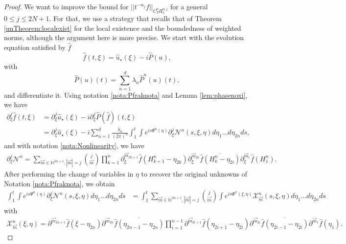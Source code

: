 \documentclass[a4paper, 15pt]{article}
\numberwithin{equation}{section}
\begin{document}
\begin{proof}
We want to improve the bound for $||t^{-\alpha_j}f||_{C^0_T H^{0,j}_x}$ for a general $0\leq j \leq 2N+1$. For that, we use a strategy that recalls that of Theorem \ref{unTheorem:localexist} for the local existence and the boundedness of weighted norms, although the argument here is more precise. We start with the evolution equation satisfied by $\hat{f}$
\begin{equation}
\label{eq:recallNLSduhamfFourier}
    \hat{f}(t,\xi)=\hat{u}_\star(\xi)-i\hat{P}(u),
\end{equation}
with 
\begin{equation}
    \hat{P}(u)(t)=\sum_{n=1}^{d}\lambda_n\hat{P}^n(u)(t),
\end{equation}
and differentiate it. Using notation \ref{nota:Pfraknota} and Lemma \ref{lem:phasenoxi}, we have 
\begin{align*}
\partial^{j}_\xi\hat{f}(t,\xi)&=\partial^{j}_\xi\hat{u}_\star(\xi)-i\partial^{j}_\xi\hat{P}(\hat{f})(t,\xi)\\
&=\partial^{j}_\xi\hat{u}_\star(\xi)-i\sum_{n=1}^{d}\frac{\lambda_n}{(2\pi)^{n}}\int^t_1\int e^{is\Psi^n(\eta)}\partial^{j}_\xi\mathcal{N}^n(s,\xi,\eta)d\eta_1\dots d\eta_{2n}ds,
\end{align*}
and with notation \ref{nota:Nonlinearity}, we have 
\begin{align*}
\partial^{j}_\xi\mathcal{N}^n=\sum_{\overrightarrow{m}\in\mathbb{N}^{2n+1},|\overrightarrow{m}|=j}\binom{j}{\overrightarrow{m}}\prod^{n}_{k=1}\partial_\xi^{\overrightarrow{m}_{2k+1}}\hat{f}(H^n_{k+1}-\eta_{2k})\partial_\xi^{\overrightarrow{m}_{2k}}\overline{\hat{f}(H^n_{k}-\eta_{2i})}\partial_\xi^{\overrightarrow{m}_{1}}\hat{f}(H^n_1).
\end{align*}
After performing the change of variables in $\eta$ to recover the original unknowns of Notation \ref{nota:Pfraknota}, we obtain
\begin{align*}
\int^t_1\int e^{is\Psi^n(\eta)}\partial^{j}_\xi\mathcal{N}^n(s,\xi,\eta)d\eta_1\dots d\eta_{2n}ds&=\int^t_1\sum_{\overrightarrow{m}\in\mathbb{N}^{2n+1}, |\overrightarrow{m}|=j}\binom{j}{\overrightarrow{m}}\int e^{is\Phi^n(\xi,\eta)}\mathcal{X}^{n}_{\overrightarrow{m}}(s,\xi,\eta)d\eta_1\dots d\eta_{2n}ds
\end{align*}
with 
\begin{align}
\mathcal{X}^{n}_{\overrightarrow{m}}(\xi,\eta)=\partial^{\overrightarrow{m}_{2n+1}}\hat{f}(\xi-\eta_{2n})\partial^{\overrightarrow{m}_{2n}}\overline{\hat{f}(\eta_{2n-1}-\eta_{2n})}\prod^{n-1}_{i=1}\partial^{\overrightarrow{m}_{2i+1}}\hat{f}(\eta_{2i+1}-\eta_{2i})\partial^{\overrightarrow{m}_{2i}}\overline{\hat{f}(\eta_{2i-1}-\eta_{2i})}\partial^{\overrightarrow{m}_{1}}\hat{f}(\eta_1).

\end{align}
\end{proof}
\end{document}
